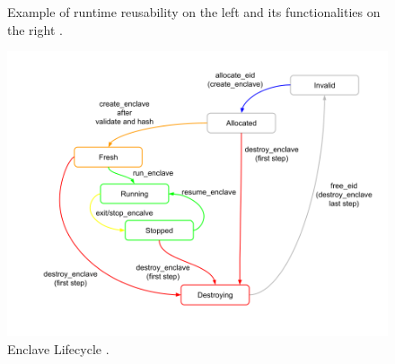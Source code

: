 \begin{figure}[h!]
    \centering
    
    \caption{Example of runtime reusability on the left and its functionalities on the right \cite{keystone-doc}.}
    \label{runtime-example}
\end{figure}

\begin{figure}[h!]
    \centering
    \includegraphics[scale=0.45]{./chapters/images/Enclave lifecycle.png}
    \caption{Enclave Lifecycle \cite{keystone-doc}.}
    \label{enclave-lifecycle}
\end{figure}

